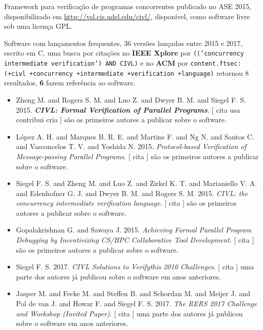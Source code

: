 Framework para verificação de programas concorrentes
publicado no ASE 2015,
disponibilizado em \url{http://vsl.cis.udel.edu/civl/},
disponível,
como software livre
sob uma licença GPL.

Software com lançamentos frequentes,
36 versões lançadas
entre 2015 e 2017,
escrito em C,
uma busca por citações no {\bf IEEE Xplore} por
\texttt{(('concurrency intermediate verification') AND CIVL)}
e no {\bf ACM} por
\texttt{content.ftsec:(+civl +concurrency +intermediate +verification +language)}
retornou
8 resultados,
{\bf 6} fazem referência ao software.

\begin{itemize}
\item Zheng M. and Rogers S. M. and Luo Z. and Dwyer B. M. and Siegel F. S.
      2015.
        \textbf{\textit{ CIVL: Formal Verification of Parallel Programs}}.
      [
          cita
          usa
          contribui
          cria
      ]
são os primeiros autores a publicar sobre o software.
\item L\'{o}pez A. H. and Marques B. R. E. and Martins F. and Ng N. and Santos C. and Vasconcelos T. V. and Yoshida N.
      2015.
        \textit{ Protocol-based Verification of Message-passing Parallel Programs}.
      [
          cita
      ]
são os primeiros autores a publicar sobre o software.
\item Siegel F. S. and Zheng M. and Luo Z. and Zirkel K. T. and Marianiello V. A. and Edenhofner G. J. and Dwyer B. M. and Rogers S. M.
      2015.
        \textit{ CIVL: the concurrency intermediate verification language}.
      [
          cita
      ]
são os primeiros autores a publicar sobre o software.
\item Gopalakrishnan G. and Sawaya J.
      2015.
        \textit{ Achieving Formal Parallel Program Debugging by Incentivizing CS/HPC Collaborative Tool Development}.
      [
          cita
      ]
são os primeiros autores a publicar sobre o software.
\item Siegel F. S.
      2017.
        \textit{ CIVL Solutions to Verifythis 2016 Challenges}.
      [
          cita
      ]
uma parte dos autores já publicou sobre o software em anos anteriores.
\item Jasper M. and Fecke M. and Steffen B. and Schordan M. and Meijer J. and Pol de van J. and Howar F. and Siegel F. S.
      2017.
        \textit{ The RERS 2017 Challenge and Workshop (Invited Paper)}.
      [
          cita
      ]
uma parte dos autores já publicou sobre o software em anos anteriores.
\end{itemize}
